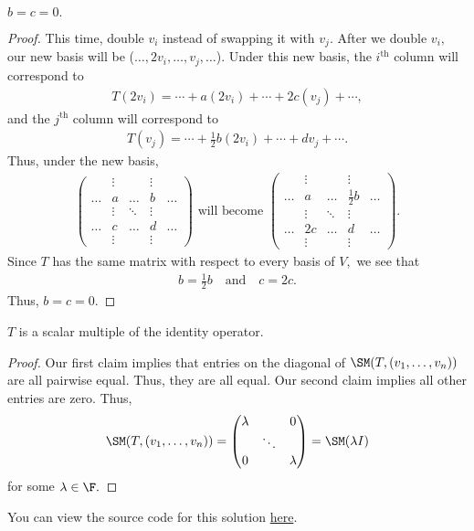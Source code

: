 \documentclass{amsart}
\newcommand{\pagenum}{304}
\newcommand{\probnum}{3}
\begin{document}
\begin{claim*}
$b=c=0.$
\end{claim*}
\begin{proof}
This time, double $v_i$ instead of swapping it with $v_j.$ After
we double $v_i,$ our new basis will be
($\ldots,2v_i,\ldots,v_j,\ldots$). Under this new
basis, the $i^\text{th}$ column will correspond to
\begin{align*}
    T(2v_i)=\cdots+a(2v_i)+\cdots+2c(v_j)+\cdots,
\end{align*}
and the $j^\text{th}$ column will correspond to
\begin{align*}
    T(v_j)=\cdots+\frac12b(2v_i)+\cdots+dv_j+\cdots.
\end{align*}
Thus, under the new basis,
\begin{align*}
    \begin{pmatrix}
        & \vdots & & \vdots & \\
       \hdots & a & \hdots & b & \hdots \\
                & \vdots & \ddots & \vdots & \\
       \hdots & c & \hdots & d & \hdots \\
              & \vdots & & \vdots &
    \end{pmatrix}
    \text{ will become }
    \begin{pmatrix}
        & \vdots & & \vdots & \\
       \hdots & a & \hdots & \frac12b & \hdots \\
                & \vdots & \ddots & \vdots & \\
       \hdots & 2c & \hdots & d & \hdots \\
              & \vdots & & \vdots &
    \end{pmatrix}.
\end{align*}
Since $T$ has the same matrix with respect to
every basis of $V,$ we see that
\begin{align*}
    b=\frac12 b\quad\text{and}\quad c=2c.
\end{align*}
Thus, $b=c=0.$
\end{proof}

\begin{claim*}
    $T$ is a scalar multiple of the identity operator.
\end{claim*}
\begin{proof}
Our first claim implies that entries on the diagonal of
$\SM(T,(v_1,\ldots,v_n))$ are all pairwise equal. Thus, they
are all equal. Our second claim implies all other entries
are zero. Thus,
\begin{align*}
    \SM(T,(v_1,\ldots,v_n))=\begin{pmatrix}
        \lambda & & 0 \\
                & \ddots & \\
        0 & & \lambda
    \end{pmatrix}
    =\SM(\lambda I)
\end{align*}
for some $\lambda\in\F.$
\end{proof}

\vspace{0.5in}

\begin{note*}
You can view the source code for this solution
\href{https://github.com/thomasbreydo/linalg/blob/main/\pagenum_\probnum_Thomas_Breydo.tex}
{here}.
\end{note*}
\end{document}
